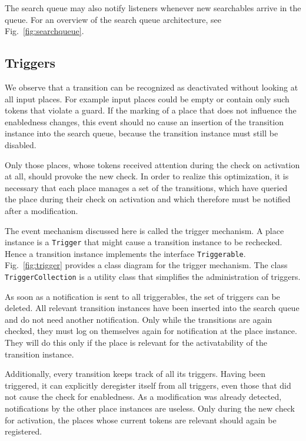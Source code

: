 The search queue may also notify listeners whenever new searchables
arrive in the queue. For an overview of the search queue architecture,
see Fig.~\ref{fig:searchqueue}.



\subsection{Triggers}

We observe that a transition can be recognized as deactivated without 
looking at all input places. For example input places could be empty 
or contain only such tokens that violate a guard. If the marking of a place
that does not influence the enabledness changes, this event should
no cause an insertion of the transition instance into the
search queue, because the transition instance must still be
disabled.

Only those places, whose tokens received attention during 
the check on activation at all, should provoke the new check. 
In order to realize this optimization, it is necessary that 
each place manages a set of the transitions, which have queried 
the place during their check on activation and which therefore 
must be notified after a modification. 

The event mechanism discussed here is called the trigger mechanism.
A place instance is a \texttt{Trigger} 
that might cause a transition instance to be
rechecked. Hence a transition instance implements
the interface \texttt{Triggerable}. Fig.~\ref{fig:trigger}
provides a class diagram for the trigger mechanism.
The class \texttt{TriggerCollection} is a utility class that
simplifies the administration of triggers.


As soon as a notification is sent to all triggerables, 
the set of triggers can be deleted. All relevant transition instances
have been inserted into the search queue and do not need another
notification. Only while the transitions are again checked, 
they must log on themselves again for notification at the place instance.
They will do this only if the place is relevant for the activatability 
of the transition instance. 

Additionally, every transition keeps track of all its triggers.
Having been triggered, it can explicitly deregister itself from
all triggers, even those that did not cause the check for enabledness.
As a modification was already detected, notifications by the other 
place instances are useless. Only during the new check for activation, 
the places whose current tokens are relevant should again be registered.

